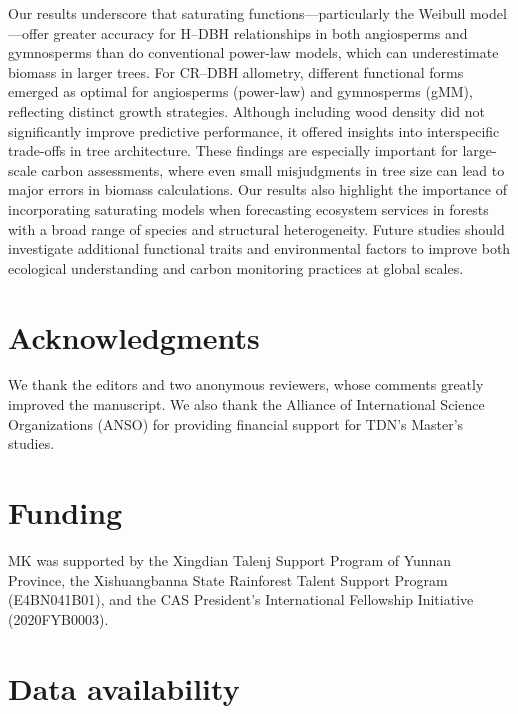\documentclass[
  12pt,
  letterpaper,
  DIV=11,
  numbers=noendperiod]{scrartcl}
\begin{document}
Our results underscore that saturating functions---particularly the
Weibull model---offer greater accuracy for H--DBH relationships in both
angiosperms and gymnosperms than do conventional power-law models, which
can underestimate biomass in larger trees. For CR--DBH allometry,
different functional forms emerged as optimal for angiosperms
(power-law) and gymnosperms (gMM), reflecting distinct growth
strategies. Although including wood density did not significantly
improve predictive performance, it offered insights into interspecific
trade-offs in tree architecture. These findings are especially important
for large-scale carbon assessments, where even small misjudgments in
tree size can lead to major errors in biomass calculations. Our results
also highlight the importance of incorporating saturating models when
forecasting ecosystem services in forests with a broad range of species
and structural heterogeneity. Future studies should investigate
additional functional traits and environmental factors to improve both
ecological understanding and carbon monitoring practices at global
scales.

\newpage

\section*{Acknowledgments}\label{acknowledgments}

We thank the editors and two anonymous reviewers, whose comments greatly
improved the manuscript. We also thank the Alliance of International
Science Organizations (ANSO) for providing financial support for TDN's
Master's studies.

\section*{Funding}\label{funding}

MK was supported by the Xingdian Talenj Support Program of Yunnan
Province, the Xishuangbanna State Rainforest Talent Support Program
(E4BN041B01), and the CAS President's International Fellowship
Initiative (2020FYB0003).

\section*{Data availability}\label{data-availability}
\end{document}
